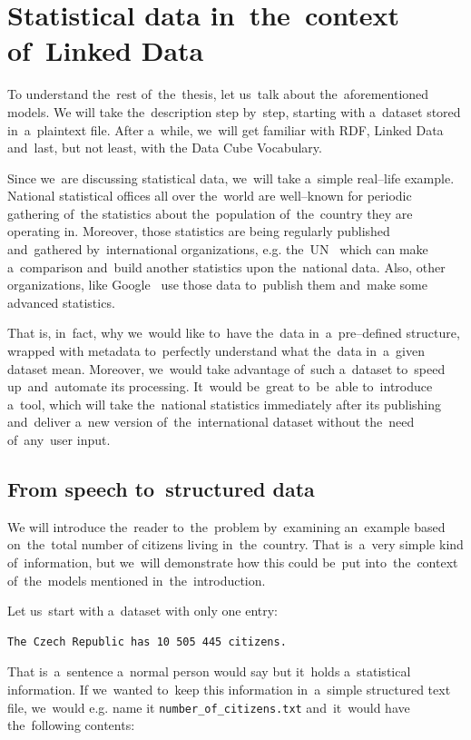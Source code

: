 \chapter{Statistical data in~the~context of~Linked Data}
\label{ch:statistical-data}
To understand the~rest of~the~thesis, let us~talk about the~aforementioned models.
We will take the~description step by~step, starting with a~dataset stored in~a~plaintext file.
After a~while, we~will get familiar with RDF, Linked Data and~last, but not least, with the
Data Cube Vocabulary.

Since we~are discussing statistical data, we~will take a~simple real--life example.
National statistical offices all over the~world are well--known for periodic gathering of~the
statistics about the~population of~the~country they are operating in. Moreover, 
those statistics are being regularly published and~gathered by~international 
organizations, e.g. the~UN~\cite{un} which can make a~comparison and~build 
another statistics upon the~national data. Also, other organizations, like 
Google~\cite{pubdata} use those data to~publish them and~make 
some advanced statistics.

That is, in~fact, why we~would like to~have the~data in~a~pre--defined structure,
wrapped with metadata to~perfectly understand what the~data in~a~given 
dataset mean. Moreover, we~would take advantage of~such a~dataset to~speed up~and~automate its processing. It~would be~great to~be~able to~introduce a~tool, 
which will take the~national statistics immediately after its publishing and~deliver a~new version of~the~international dataset without the~need of~any~user 
input.

\section{From speech to~structured data}

We will introduce the~reader to~the~problem by~examining an~example based on~the~total number of
citizens living in~the~country. That is~a~very simple kind of~information, but we~will demonstrate
how this could be~put into~the~context of~the~models mentioned in~the~introduction.

Let us~start with a~dataset with only one entry:

\begin{verbatim}
The Czech Republic has 10 505 445 citizens.
\end{verbatim}

That is~a~sentence a~normal person would say but it~holds a~statistical information.
If we~wanted to~keep this information in~a~simple structured text file, we~would e.g. name it
\texttt{number\_of\_citizens.txt} and~it~would have the~following contents:

